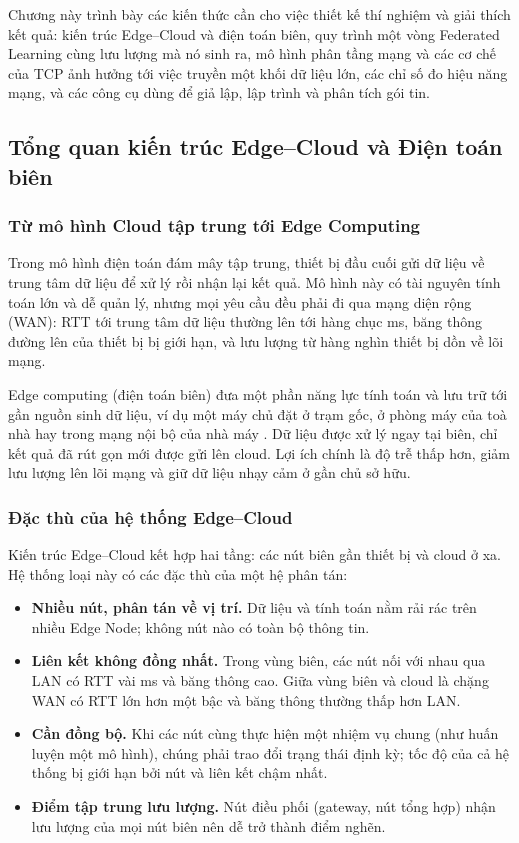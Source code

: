 \setcounter{section}{1}
\setcounter{equation}{0}
Chương này trình bày các kiến thức cần cho việc thiết kế thí nghiệm và giải thích kết quả: kiến trúc Edge--Cloud và điện toán biên, quy trình một vòng Federated Learning cùng lưu lượng mà nó sinh ra, mô hình phân tầng mạng và các cơ chế của TCP ảnh hưởng tới việc truyền một khối dữ liệu lớn, các chỉ số đo hiệu năng mạng, và các công cụ dùng để giả lập, lập trình và phân tích gói tin.

\subsection{Tổng quan kiến trúc Edge--Cloud và Điện toán biên}
\label{sec:1-1}

\subsubsection{Từ mô hình Cloud tập trung tới Edge Computing}
Trong mô hình điện toán đám mây tập trung, thiết bị đầu cuối gửi dữ liệu về trung tâm dữ liệu để xử lý rồi nhận lại kết quả. Mô hình này có tài nguyên tính toán lớn và dễ quản lý, nhưng mọi yêu cầu đều phải đi qua mạng diện rộng (WAN): RTT tới trung tâm dữ liệu thường lên tới hàng chục ms, băng thông đường lên của thiết bị bị giới hạn, và lưu lượng từ hàng nghìn thiết bị dồn về lõi mạng.

Edge computing (điện toán biên) đưa một phần năng lực tính toán và lưu trữ tới gần nguồn sinh dữ liệu, ví dụ một máy chủ đặt ở trạm gốc, ở phòng máy của toà nhà hay trong mạng nội bộ của nhà máy \cite{shi2016edge}. Dữ liệu được xử lý ngay tại biên, chỉ kết quả đã rút gọn mới được gửi lên cloud. Lợi ích chính là độ trễ thấp hơn, giảm lưu lượng lên lõi mạng và giữ dữ liệu nhạy cảm ở gần chủ sở hữu.

\subsubsection{Đặc thù của hệ thống Edge--Cloud}
Kiến trúc Edge--Cloud kết hợp hai tầng: các nút biên gần thiết bị và cloud ở xa. Hệ thống loại này có các đặc thù của một hệ phân tán:
\begin{itemize}
    \item \textbf{Nhiều nút, phân tán về vị trí.} Dữ liệu và tính toán nằm rải rác trên nhiều Edge Node; không nút nào có toàn bộ thông tin.
    \item \textbf{Liên kết không đồng nhất.} Trong vùng biên, các nút nối với nhau qua LAN có RTT vài ms và băng thông cao. Giữa vùng biên và cloud là chặng WAN có RTT lớn hơn một bậc và băng thông thường thấp hơn LAN.
    \item \textbf{Cần đồng bộ.} Khi các nút cùng thực hiện một nhiệm vụ chung (như huấn luyện một mô hình), chúng phải trao đổi trạng thái định kỳ; tốc độ của cả hệ thống bị giới hạn bởi nút và liên kết chậm nhất.
    \item \textbf{Điểm tập trung lưu lượng.} Nút điều phối (gateway, nút tổng hợp) nhận lưu lượng của mọi nút biên nên dễ trở thành điểm nghẽn.
\end{itemize}

